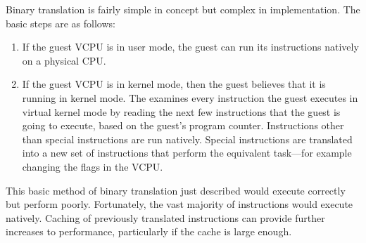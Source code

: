 Binary translation is fairly simple in concept but complex in implementation.
The basic steps are as follows:
\begin{enumerate}[noitemsep]
\item If the guest VCPU is in user mode, the guest can run its instructions natively on a physical CPU.\@
\item If the guest VCPU is in kernel mode, then the guest believes that it is running in kernel mode.
  The  examines every instruction the guest executes in virtual kernel mode by reading the next few instructions that the guest is going to execute, based on the guest's program counter.
  Instructions other than special instructions are run natively.
  Special instructions are translated into a new set of instructions that perform the equivalent task—for example changing the flags in the VCPU.\@
\end{enumerate}

This basic method of binary translation just described would execute correctly but perform poorly.
Fortunately, the vast majority of instructions would execute natively.
Caching of previously translated instructions can provide further increases to performance, particularly if the cache is large enough.



